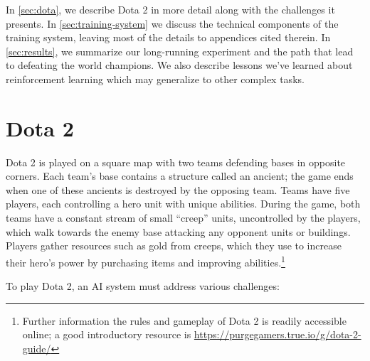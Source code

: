 \documentclass[11pt]{article}
\newcommand{\dota}{Dota 2\xspace}
\begin{document}
In \autoref{sec:dota}, we describe \dota in more detail along with the challenges it presents. In \autoref{sec:training-system} we discuss the technical components of the training system, leaving most of the details to appendices cited therein. 
In \autoref{sec:results}, we summarize our long-running experiment and the path that lead to defeating the world champions. 
We also describe lessons we've learned about reinforcement learning which may generalize to other complex tasks.

\section{\dota}\label{sec:dota}

\dota is played on a square map with two teams defending bases in opposite corners.
Each team's base contains a structure called an ancient; the game ends when one of these ancients is destroyed by the opposing team.
Teams have five players, each controlling a hero unit with unique abilities.
During the game, both teams have a constant stream of small ``creep'' units, uncontrolled by the players, which walk towards the enemy base attacking any opponent units or buildings.
Players gather resources such as gold from creeps, which they use to increase their hero's power by purchasing items and improving abilities.\footnote{Further information the rules and gameplay of \dota is readily accessible online; a good introductory resource is \url{https://purgegamers.true.io/g/dota-2-guide/}}

To play \dota, an AI system must address various challenges:
\end{document}
